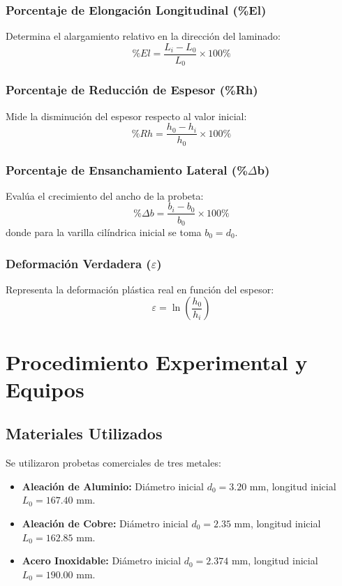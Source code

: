 \documentclass[journal]{IEEEtran}
\begin{document}
\subsubsection{Porcentaje de Elongación Longitudinal (\%El)}
Determina el alargamiento relativo en la dirección del laminado:
\begin{equation}
\%El = \frac{L_i - L_0}{L_0} \times 100\%
\label{eq:elongacion}
\end{equation}

\subsubsection{Porcentaje de Reducción de Espesor (\%Rh)}
Mide la disminución del espesor respecto al valor inicial:
\begin{equation}
\%Rh = \frac{h_0 - h_i}{h_0} \times 100\%
\label{eq:rh}
\end{equation}

\subsubsection{Porcentaje de Ensanchamiento Lateral (\%\texorpdfstring{$\Delta$}{D}b)}
Evalúa el crecimiento del ancho de la probeta:
\begin{equation}
\%\Delta b = \frac{b_i - b_0}{b_0} \times 100\%
\label{eq:delta_b}
\end{equation}
donde para la varilla cilíndrica inicial se toma $b_0 = d_0$.

\subsubsection{Deformación Verdadera (\texorpdfstring{$\varepsilon$}{e})}
Representa la deformación plástica real en función del espesor:
\begin{equation}
\varepsilon = \ln\left(\frac{h_0}{h_i}\right)
\label{eq:deformacion}
\end{equation}

\section{Procedimiento Experimental y Equipos}

\subsection{Materiales Utilizados}
Se utilizaron probetas comerciales de tres metales:
\begin{itemize}
    \item \textbf{Aleación de Aluminio:} Diámetro inicial $d_0 = 3.20\text{ mm}$, longitud inicial $L_0 = 167.40\text{ mm}$.
    \item \textbf{Aleación de Cobre:} Diámetro inicial $d_0 = 2.35\text{ mm}$, longitud inicial $L_0 = 162.85\text{ mm}$.
    \item \textbf{Acero Inoxidable:} Diámetro inicial $d_0 = 2.374\text{ mm}$, longitud inicial $L_0 = 190.00\text{ mm}$.
\end{itemize}
\end{document}
